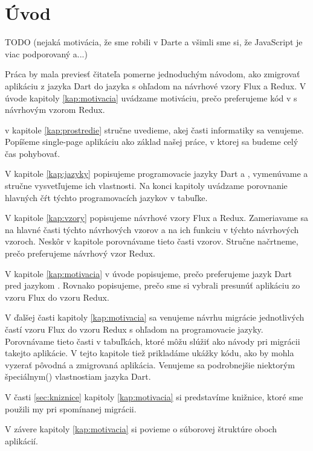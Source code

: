 \chapter*{Úvod} %

TODO{} (nejaká motivácia, že sme robili v Darte a všimli sme si, že JavaScript je viac podporovaný a...)

Práca by mala previesť čitateľa pomerne jednoduchým návodom, ako zmigrovať aplikáciu z jazyka Dart do jazyka \JS{} s ohľadom na návrhové vzory Flux a Redux. V úvode kapitoly \ref{kap:motivacia} uvádzame motiváciu, prečo preferujeme kód v \JS{} s návrhovým vzorom Redux.

v kapitole \ref{kap:prostredie} stručne uvedieme, akej časti informatiky sa venujeme. Popíšeme single-page aplikáciu ako základ našej práce, v ktorej sa budeme celý čas pohybovať.

V kapitole \ref{kap:jazyky} popisujeme programovacie jazyky Dart a \JS{}, vymenúvame a stručne vysvetľujeme ich vlastnosti. Na konci kapitoly uvádzame porovnanie hlavných čŕt týchto programovacích jazykov v tabuľke.

V kapitole \ref{kap:vzory} popisujeme návrhové vzory Flux a Redux. Zameriavame sa na hlavné časti týchto návrhových vzorov a na ich funkciu v týchto návrhových vzoroch. Neskôr v kapitole porovnávame tieto časti vzorov. Stručne načrtneme, prečo preferujeme návrhový vzor Redux.

V kapitole \ref{kap:motivacia} v úvode popisujeme, prečo preferujeme jazyk Dart pred jazykom \JS{}. Rovnako popisujeme, prečo sme si vybrali presunúť aplikáciu zo vzoru Flux do vzoru Redux.

V ďalšej časti kapitoly \ref{kap:motivacia} sa venujeme návrhu migrácie jednotlivých častí vzoru Flux do vzoru Redux s ohľadom na programovacie jazyky. Porovnávame tieto časti v tabuľkách, ktoré môžu slúžiť ako návody pri migrácii takejto aplikácie. V tejto kapitole tiež prikladáme ukážky kódu, ako by mohla vyzerať pôvodná a zmigrovaná aplikácia. Venujeme sa podrobnejšie niektorým špeciálnym() vlastnostiam jazyka Dart.

V časti \ref{sec:kniznice} kapitoly \ref{kap:motivacia} si predstavíme knižnice, ktoré sme použili my pri spomínanej migrácii.

V závere kapitoly \ref{kap:motivacia} si povieme o súborovej štruktúre oboch aplikácií.

\begin{comment}

Tu bude úvod do problematiky o mojej bakalárskej práci, načrtnutie problému a stručné popísanie obsahu jednotlivých kapitol.
\end{comment}